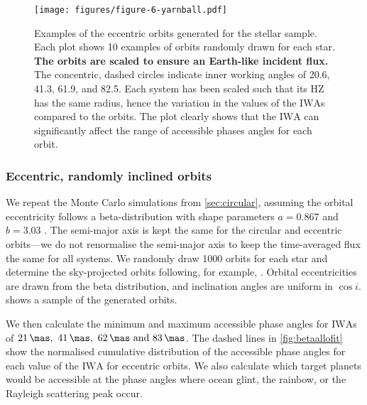 \documentclass[usenatbib]{mnras}
\newcommand{\IWA}{\ensuremath{\mathrm{IWA}}\xspace}
\begin{document}
\begin{figure*}
    \centering
    \texttt{[image: figures/figure-6-yarnball.pdf]}  
    \caption{
        Examples of the eccentric orbits generated for the stellar sample. 
        Each plot shows 10 examples of orbits randomly drawn for each star.
        {\bf The orbits are scaled to ensure an Earth-like incident flux.} 
        The concentric, dashed circles indicate inner working angles of \num{20.6}, \num{41.3}, \num{61.9}, and \qty{82.5}{\mas}.
        Each system has been scaled such that its HZ has the same radius, hence the variation in the values of the \IWA{}s compared to the orbits.
        The plot clearly shows that the \IWA can significantly affect the range of accessible phases angles for each orbit.
    }
    \label{fig:ball-o-yarn}
\end{figure*}

\subsubsection{Eccentric, randomly inclined orbits}
\label{sec:eccentric}

We repeat the Monte Carlo simulations from \cref{sec:circular}, assuming the orbital eccentricity follows a beta-distribution with shape parameters $a=0.867$ and $b=3.03$ \citep{2013MNRAS.434L..51K}. 
%
The semi-major axis is kept the same for the circular and eccentric orbits---we do not renormalise the semi-major axis to keep the time-averaged flux the same for all systems.
%
We randomly draw \num{1000} orbits for each star and determine the sky-projected orbits following, for example, \citet{2010exop.book...15M}. 
%
Orbital eccentricities are drawn from the beta distribution, and inclination angles are uniform in $\cos i$. 
%
 shows a sample of the generated orbits.

We then calculate the minimum and maximum accessible phase angles for \IWA{}s of $\qtylist{21; 41; 62; 83}{\mas}$.
%
The dashed lines in \cref{fig:betaallofit} show the normalised cumulative distribution of the accessible phase angles for each value of the \IWA for eccentric orbits. 
%
We also calculate which target planets would be accessible at the phase angles where ocean glint, the rainbow, or the Rayleigh scattering peak occur.
\end{document}
